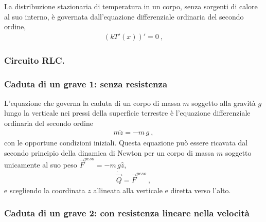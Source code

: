 \documentclass[letterpaper,10pt,italian]{jupyterBook}
\begin{document}
\sphinxAtStartPar
{} La distribuzione stazionaria di temperatura in un corpo, senza sorgenti di calore al suo interno, è governata dall’equazione differenziale ordinaria del secondo ordine,
\begin{equation*}
\begin{split}( k T'(x) )' = 0 \ ,\end{split}
\end{equation*}\subsubsection*{Circuito RLC. }

\sphinxAtStartPar
{} 
\subsubsection*{Caduta di un grave \sphinxhyphen{} 1: senza resistenza}

\sphinxAtStartPar
{} L’equazione che governa la caduta di un corpo di massa \(m\) soggetto alla gravità \(g\) lungo la verticale nei pressi della superficie terrestre è l’equazione differenziale ordinaria del secondo ordine
\begin{equation*}
\begin{split}m \ddot{z} = - m \, g \ ,\end{split}
\end{equation*}
\sphinxAtStartPar
con le opportune condizioni iniziali.
Questa equazione può essere ricavata dal secondo principio della dinamica di Newton per un corpo di massa \(m\) soggetto unicamente al suo peso \(\vec{F}^{peso} = - m \, g \hat{z}\),
\begin{equation*}
\begin{split}\dot{\vec{Q}} = \vec{F}^{peso} \ ,\end{split}
\end{equation*}
\sphinxAtStartPar
e scegliendo la coordinata \(z\) allineata alla verticale e diretta verso l’alto.
\subsubsection*{Caduta di un grave \sphinxhyphen{} 2: con resistenza lineare nella velocità}
\end{document}
